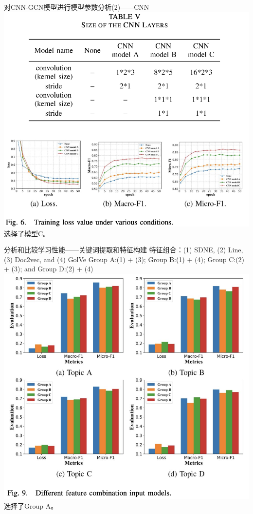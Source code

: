 \documentclass{beamer}
\begin{document}
\begin{frame}{对CNN-GCN模型进行模型参数分析(2)——CNN}
	\includegraphics[width=0.8\linewidth]{Assets/表5_图6.png}\\
	选择了模型C。
\end{frame}

\begin{frame}{分析和比较学习性能——关键词提取和特征构建}
	特征组合：(1) SDNE, (2) Line, (3) Doc2vec, and (4) GolVe
	Group A:(1) + (3); Group B:(1) + (4); Group C:(2) + (3); and Group D:(2) + (4)\\
	\includegraphics[width=0.6\linewidth]{Assets/图9.png}\\
	选择了Group A。
\end{frame}
\end{document}
